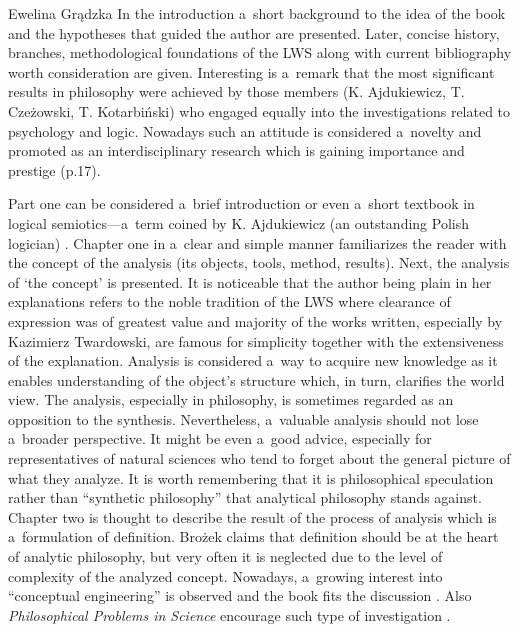 \begin{newrevengenv}{Ewelina Grądzka}
In the introduction a~short background to the idea of the book and the hypotheses that guided the author are presented. Later, concise history, branches, methodological foundations of the LWS along with current bibliography worth consideration are given. Interesting is a~remark that the most significant results in philosophy were achieved by those members (K. Ajdukiewicz, T. Czeżowski, T. Kotarbiński) who engaged equally into the investigations related to psychology and logic. Nowadays such an attitude is considered a~novelty and promoted as an interdisciplinary research which is gaining importance and prestige (p.17).

Part one can be considered a~brief introduction or even a~short textbook in logical semiotics---a~term coined by K. Ajdukiewicz (an outstanding Polish logician)
\parencite[cf.][]{pelc_logical_1979}. %
 Chapter one in a~clear and simple manner familiarizes the reader with the concept of the analysis (its objects, tools, method, results). Next, the analysis of ‘the concept' is presented. It is noticeable that the author being plain in her explanations refers to the noble tradition of the LWS where clearance of expression was of greatest value and majority of the works written, especially by Kazimierz Twardowski, are famous for simplicity together with the extensiveness of the explanation. Analysis is considered a~way to acquire new knowledge as it enables understanding of the object's structure which, in turn, clarifies the world view. The analysis, especially in philosophy, is sometimes regarded as an opposition to the synthesis. Nevertheless, a~valuable analysis should not lose a~broader perspective. It might be even a~good advice, especially for representatives of natural sciences who tend to forget about the general picture of what they analyze. It is worth remembering that it is philosophical speculation rather than ``synthetic philosophy'' that analytical philosophy stands against. Chapter two is thought to describe the result of the process of analysis which is a~formulation of definition. Brożek claims that definition should be at the heart of analytic philosophy, but very often it is neglected due to the level of complexity of the analyzed concept. Nowadays, a~growing interest into ``conceptual engineering'' is observed and the book fits the discussion 
\parencites[cf.][]{chalmers_what_2020}[][]{koch_engineering_2020}. %
 Also \textit{Philosophical Problems in Science} encourage such type of investigation 
\parencites[cf.][]{awodey_homunculus_2020}[][]{piechowicz_formal_2020}.%



\end{newrevengenv}
